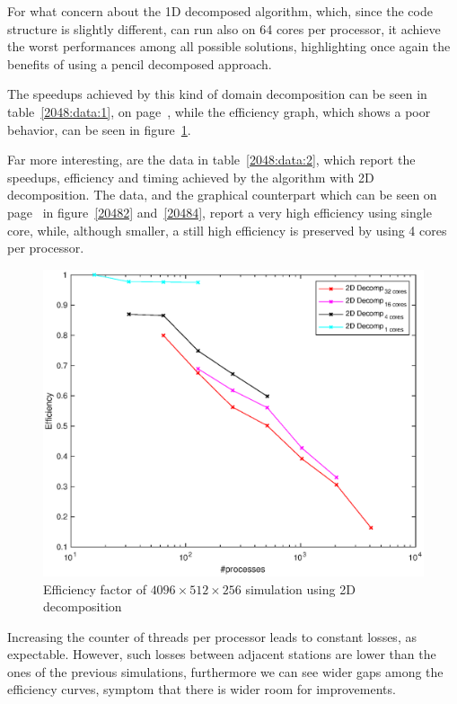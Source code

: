 \par
For what concern about the 1D decomposed algorithm, which, since the code structure is slightly different, can run also on 64 cores per processor, it achieve the worst performances among all possible solutions, highlighting once again the benefits of using a pencil decomposed approach. \par
The speedups achieved by this kind of domain decomposition can be seen in table~\ref{2048:data:1}, on page~\pageref{2048:data:1}, while the efficiency graph, which shows a poor behavior, can be seen in figure~\ref{20483}. \\
\par
Far more interesting, are the data in table~\ref{2048:data:2}, which report the speedups, efficiency and timing achieved by the algorithm with 2D decomposition. The data, and the graphical counterpart which can be seen on page~\pageref{20482} in figure~\ref{20482} and~\ref{20484}, report a very high efficiency using single core, while, although smaller, a still high efficiency is preserved by using 4 cores per processor.\\
\par
\begin{figure}
\begin{center}
\includegraphics[scale=0.6]{grafici/20484}
\caption{Efficiency factor of $4096\times512 \times256$ simulation using 2D decomposition}
\label{20483}
\end{center}
\end{figure}
Increasing the counter of threads per processor leads to constant losses, as expectable. However, such losses between adjacent stations are lower than the ones of the previous simulations, furthermore we can see wider gaps among the efficiency curves, symptom that there is wider room for improvements.\par
